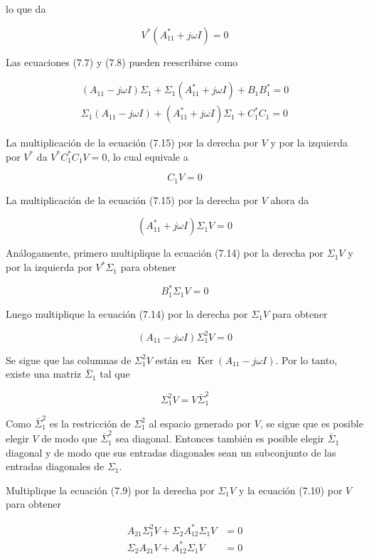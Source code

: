 lo que da

$$
V^{*}\left(A_{11}^{*}+j \omega I\right)=0
$$

Las ecuaciones (7.7) y (7.8) pueden reescribirse como


\begin{gather*}
\left(A_{11}-j \omega I\right) \Sigma_{1}+\Sigma_{1}\left(A_{11}^{*}+j \omega I\right)+B_{1} B_{1}^{*}=0  \tag{7.14}\\
\Sigma_{1}\left(A_{11}-j \omega I\right)+\left(A_{11}^{*}+j \omega I\right) \Sigma_{1}+C_{1}^{*} C_{1}=0 \tag{7.15}
\end{gather*}


La multiplicación de la ecuación (7.15) por la derecha por $V$ y por la izquierda por $V^{*}$ da $V^{*} C_{1}^{*} C_{1} V=0$, lo cual equivale a

$$
C_{1} V=0
$$

La multiplicación de la ecuación (7.15) por la derecha por $V$ ahora da

$$
\left(A_{11}^{*}+j \omega I\right) \Sigma_{1} V=0
$$

Análogamente, primero multiplique la ecuación (7.14) por la derecha por $\Sigma_{1} V$ y por la izquierda por $V^{*} \Sigma_{1}$ para obtener

$$
B_{1}^{*} \Sigma_{1} V=0
$$

Luego multiplique la ecuación (7.14) por la derecha por $\Sigma_{1} V$ para obtener

$$
\left(A_{11}-j \omega I\right) \Sigma_{1}^{2} V=0
$$

Se sigue que las columnas de $\Sigma_{1}^{2} V$ están en $\operatorname{Ker}\left(A_{11}-j \omega I\right)$. Por lo tanto, existe una matriz $\bar{\Sigma}_{1}$ tal que

$$
\Sigma_{1}^{2} V=V \bar{\Sigma}_{1}^{2}
$$

Como $\bar{\Sigma}_{1}^{2}$ es la restricción de $\Sigma_{1}^{2}$ al espacio generado por $V$, se sigue que es posible elegir $V$ de modo que $\bar{\Sigma}_{1}^{2}$ sea diagonal. Entonces también es posible elegir $\bar{\Sigma}_{1}$ diagonal y de modo que sus entradas diagonales sean un subconjunto de las entradas diagonales de $\Sigma_{1}$.

Multiplique la ecuación (7.9) por la derecha por $\Sigma_{1} V$ y la ecuación (7.10) por $V$ para obtener

$$
\begin{aligned}
A_{21} \Sigma_{1}^{2} V+\Sigma_{2} A_{12}^{*} \Sigma_{1} V & =0 \\
\Sigma_{2} A_{21} V+A_{12}^{*} \Sigma_{1} V & =0
\end{aligned}
$$

